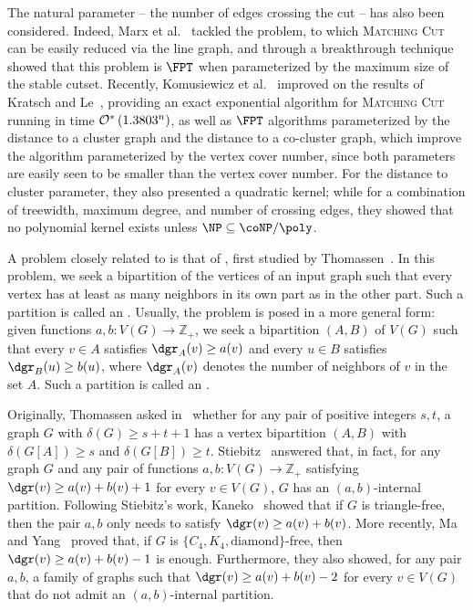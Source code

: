The natural parameter -- the number of edges crossing the cut -- has also been considered.
Indeed, Marx et al.~\cite{marx_treewidth_reduction} tackled the  problem, to which \textsc{Matching Cut} can be easily reduced via the line graph, and through a breakthrough technique showed that this problem is $\FPT$ when parameterized by the maximum size of the stable cutset.
Recently, Komusiewicz et al.~\cite{matching_cut_ipec} improved on the results of Kratsch and Le~\cite{matching_cut_tcs}, providing an exact exponential algorithm for \textsc{Matching Cut} running in  time $\mathcal{O}^*\left(1.3803^n\right)$, as well as $\FPT$ algorithms parameterized by the distance to a cluster graph and the distance to a co-cluster graph, which improve the algorithm parameterized by the vertex cover number, since both parameters are easily seen to be smaller than the vertex cover number.
For the distance to cluster parameter, they also presented a quadratic kernel; while for a combination of treewidth, maximum degree, and number of crossing edges, they showed that no polynomial kernel exists unless $\NP \subseteq \coNP/\poly$.

A problem  closely related to  is that of , first studied by Thomassen~\cite{internal_partition_thomassen}.
In this problem, we seek a bipartition of the vertices of an input graph such that every vertex has at least as many neighbors in its
own part as in the other part. Such a partition is called an .
Usually, the problem is posed in a more general form: given functions $a,b: V(G) \rightarrow \mathbb{Z}_+$, we seek a bipartition $(A,B)$ of $V(G)$ such that every $v \in A$ satisfies $\dgr_A(v) \geq a(v)$ and every $u \in B$ satisfies $\dgr_B(u) \geq b(u)$, where $\dgr_A(v)$ denotes the number of neighbors of $v$ in the set $A$. Such a partition is called an .

Originally, Thomassen asked in~\cite{internal_partition_thomassen} whether for any pair of positive integers $s,t$, a graph $G$ with $\delta(G) \geq s + t + 1$ has a vertex bipartition $(A,B)$ with $\delta(G[A]) \geq s$ and $\delta(G[B]) \geq t$.
Stiebitz~\cite{internal_partition_stiebitz} answered that, in fact, for any graph $G$ and any pair of functions $a,b: V(G) \rightarrow \mathbb{Z}_+$ satisfying $\dgr(v) \geq a(v) + b(v) + 1$ for every $v \in V(G)$, $G$ has an $(a,b)$-internal partition.
Following Stiebitz's work, Kaneko~\cite{internal_partition_triangle_free} showed that if $G$ is triangle-free, then the pair $a,b$ only needs to satisfy $\dgr(v) \geq a(v) + b(v)$.
More recently, Ma and Yang~\cite{internal_partition_c4_free} proved that, if $G$ is $\{C_4, K_4, \text{diamond}\}$-free, then $\dgr(v) \geq a(v) + b(v) - 1$ is enough.
Furthermore, they also showed, for any pair $a,b$, a family of graphs such that $\dgr(v) \geq a(v) + b(v) - 2$ for every $v \in V(G)$ that do not admit an $(a,b)$-internal partition.

